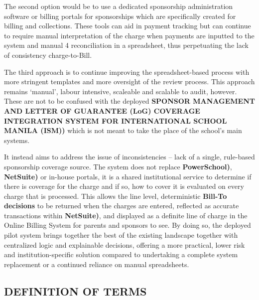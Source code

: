     The second option would be to use a dedicated sponsorship administration software or billing portals for sponsorships which are specifically created for billing and collections. These tools can aid in payment tracking but can continue to require manual interpretation of the charge when payments are inputted to the system and manual 4 reconciliation in a spreadsheet, thus perpetuating the lack of consistency charge-to-Bill. 
    
    The third approach is to continue improving the spreadsheet-based process with more stringent templates and more oversight of the review process. This approach remains ‘manual', labour intensive, scaleable and scalable to audit, however. These are not to be confused with the deployed \textbf{SPONSOR MANAGEMENT AND LETTER OF GUARANTEE (LoG) COVERAGE INTEGRATION SYSTEM FOR INTERNATIONAL SCHOOL MANILA (ISM))} which is not meant to take the place of the school's main systems. 
    
    It instead aims to address the issue of inconsistencies – lack of a single, rule-based sponsorship coverage source. The system does not replace \textbf{PowerSchool)}, \textbf{NetSuite)} or in-house portals, it is a shared institutional service to determine if there is coverage for the charge and if so, how to cover it is evaluated on every charge that is processed. This allows the line level, deterministic \textbf{Bill-To decisions} to be returned when the charges are entered, reflected as accurate transactions within \textbf{NetSuite)}, and displayed as a definite line of charge in the Online Billing System for parents and sponsors to see. By doing so, the deployed pilot system brings together the best of the existing landscape together with centralized logic and explainable decisions, offering a more practical, lower risk and institution-specific solution compared to undertaking a complete system replacement or a continued reliance on manual spreadsheets.
    \pagebreak

\subsection{DEFINITION OF TERMS}

